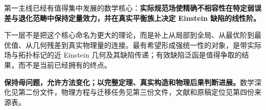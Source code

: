 \documentclass[UTF8,a4paper,11pt,fontset=fandol]{ctexart}
\begin{document}
第一主线已经有值得集中发展的数学核心：\textbf{实际规范场使精确不相容性在特定弱误差与退化范畴中保持定量效力，并在真实平衡族上决定
Einstein 缺陷的线性阶。}

下一层不是把这个核心命名为更大的理论，而是补上从局部到全局、从最优阶到最优值、从几何残差到真实物理量的连接。最有希望形成强统一性的对象，是带实际场与拓扑标记的近
Einstein
几何及其缺陷传递；有效缺陷泛函是值得争取的结果，而不是当前已经拥有的终点。

\textbf{保持母问题，允许方法变化；以完整定理、真实构造和物理后果判断进展。}数学深化见第二份文件，物理方程与迁移任务见第三份文件，文献和原稿定位见第四份来源表。
\end{document}
